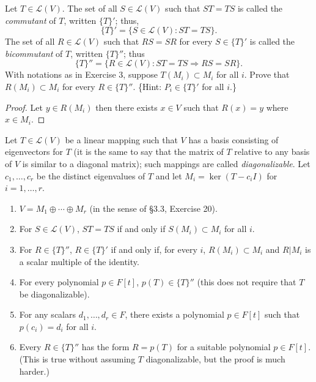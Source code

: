 \newpage
\begin{tcolorbox}[title=Problem 4, breakable]
    Let $T \in \mathcal{L}(V)$. The set of all $S \in \mathcal{L}(V)$ such that $ST = TS$ is called the \emph{commutant} of $T$, written $\{T\}'$; thus,
    \[\{T\}' = \{S \in \mathcal{L}(V) : ST = TS\}.\]
    The set of all $R \in \mathcal{L}(V)$ such that $RS = SR$ for every $S \in \{T\}'$ is called the \emph{bicommutant} of $T$, written $\{T\}''$; thus
    \[\{T\}'' = \{R \in \mathcal{L}(V) : ST = TS \Rightarrow RS = SR\}.\]
    With notations as in Exercise 3, suppose $T(M_i) \subset M_i$ for all $i$. Prove that $R(M_i) \subset M_i$ for every $R \in \{T\}''$. \{Hint: $P_i \in \{T\}'$ for all $i$.\}
\end{tcolorbox}

\begin{proof}
    Let $y \in R(M_i)$ then there exists $x \in V$ such that $R(x) = y$ where $x \in M_i$.
\end{proof}

\begin{tcolorbox}[title=Problem 5, breakable]
    Let $T \in \mathcal{L}(V)$ be a linear mapping such that $V$ has a basis consisting of eigenvectors for $T$ (it is the same to say that the matrix of $T$ relative to any basis of $V$ is similar to a diagonal matrix); such mappings are called \emph{diagonalizable}. Let $c_1, \ldots, c_r$ be the distinct eigenvalues of $T$ and let $M_i = \ker(T - c_i I)$ for $i = 1, \ldots, r$.
    \begin{enumerate}
        \item[(i)] $V = M_1 \oplus \cdots \oplus M_r$ (in the sense of \S3.3, Exercise 20).
        \item[(ii)] For $S \in \mathcal{L}(V)$, $ST = TS$ if and only if $S(M_i) \subset M_i$ for all $i$.
        \item[(iii)] For $R \in \{T\}''$, $R \in \{T\}'$ if and only if, for every $i$, $R(M_i) \subset M_i$ and $R|M_i$ is a scalar multiple of the identity.
        \item[(iv)] For every polynomial $p \in F[t]$, $p(T) \in \{T\}''$ (this does not require that $T$ be diagonalizable).
        \item[(v)] For any scalars $d_1, \ldots, d_r \in F$, there exists a polynomial $p \in F[t]$ such that $p(c_i) = d_i$ for all $i$.
        \item[(vi)] Every $R \in \{T\}''$ has the form $R = p(T)$ for a suitable polynomial $p \in F[t]$. (This is true without assuming $T$ diagonalizable, but the proof is much harder.)
    \end{enumerate}
\end{tcolorbox}

